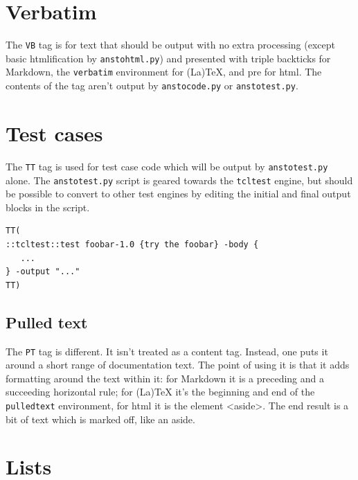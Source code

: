 \section{Verbatim}
\label{verbatim}

The \texttt{VB} tag is for text that should be output with no extra processing (except basic htmlification by \texttt{anstohtml.py}) and presented with triple backticks for Markdown, the \texttt{verbatim} environment for (La)TeX, and pre for html. The contents of the tag aren't output by \texttt{anstocode.py} or \texttt{anstotest.py}.

\section{Test cases}
\label{test-cases}

The \texttt{TT} tag is used for test case code which will be output by \texttt{anstotest.py} alone. The \texttt{anstotest.py} script is geared towards the \texttt{tcltest} engine, but should be possible to convert to other test engines by editing the initial and final output blocks in the script.

\begin{verbatim}
TT(
::tcltest::test foobar-1.0 {try the foobar} -body {
   ...
} -output "..."
TT)
\end{verbatim}

\begin{pulledtext}

\section{Pulled text}
\label{pulled-text}

The \texttt{PT} tag is different. It isn't treated as a content tag. Instead, one puts it around a short range of documentation text. The point of using it is that it adds formatting around the text within it: for Markdown it is a preceding and a succeeding horizontal rule; for (La)TeX it's the beginning and end of the \texttt{pulledtext} environment, for html it is the element <aside>. The end result is a bit of text which is marked off, like an aside.
\end{pulledtext}

\section{Lists}
\label{lists}

